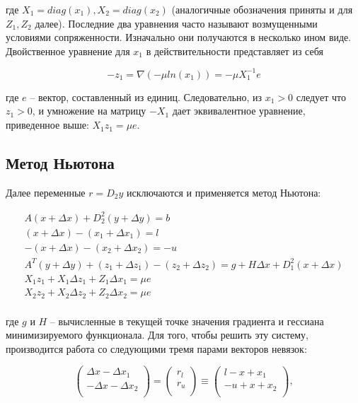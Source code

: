 \documentclass[a4paper, 12pt, titlepage]{article}
\theoremstyle{definition}
\theoremstyle{plain}
\theoremstyle{plain}
\begin{document}
где $X_{1} = diag(x_{1}), X_{2} = diag(x_{2})$ (аналогичные обозначения приняты
и для $Z_{1}, Z_{2}$ далее). Последние два уравнения часто называют
возмущенными условиями сопряженности. Изначально они получаются в несколько
ином виде. Двойственное уравнение для $x_{1}$ в действительности представляет
из себя

\begin{equation}
 -z_{1} = \nabla(-\mu ln(x_{1})) = -\mu X_{1}^{-1} e
\end{equation}

где $e$ -- вектор, составленный из единиц. Следовательно, из $x_{1} > 0$
следует что $z_{1} > 0$, и умножение на матрицу $-X_{1}$ дает эквивалентное
уравнение, приведенное выше: $X_{1} z_{1} = \mu e$.

\subsection{Метод Ньютона}

Далее переменные $r = D_{2} y$ исключаются и применяется метод Ньютона:

\begin{equation}
 \begin{aligned}
  A(x + \Delta x) + D_{2}^{2} (y + \Delta y) = b \\
  (x + \Delta x) - (x_{1} + \Delta x_{1}) = l \\
  -(x + \Delta x) - (x_{2} + \Delta x_{2}) = -u \\
  A^{T} (y + \Delta y) + (z_{1} + \Delta z_{1}) - (z_{2} + \Delta z_{2}) =
  g + H \Delta x + D_{1}^{2} (x + \Delta x) \\
  X_{1} z_{1} + X_{1} \Delta z_{1} + Z_{1} \Delta x_{1} = \mu e \\
  X_{2} z_{2} + X_{2} \Delta z_{2} + Z_{2} \Delta x_{2} = \mu e \\
 \end{aligned}
\end{equation}

где $g$ и $H$ -- вычисленные в текущей точке значения градиента и гессиана
минимизируемого функционала. Для того, чтобы решить эту систему, производится 
работа со следующими тремя парами векторов невязок:

\begin{equation}
 \label{eq:newton1}
 \left(
  \begin{array}{c}
   \Delta x - \Delta x_{1} \\
   - \Delta x - \Delta x_{2} \\
   \end{array}
 \right) =
 \left(
  \begin{array}{c}
   r_{l} \\
   r_{u} \\
   \end{array}
 \right) \equiv
 \left(
  \begin{array}{c}
   l - x + x_{1} \\
   -u + x + x_{2} \\
   \end{array}
 \right),
\end{equation}
\end{document}

